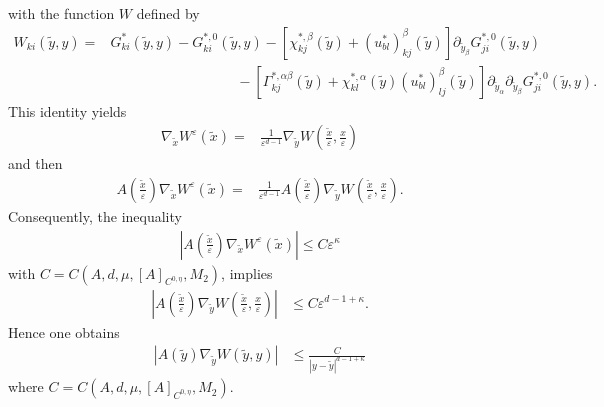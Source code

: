 \documentclass[11pt, reqno]{amsart}
\theoremstyle{definition}
\theoremstyle{remark}
\numberwithin{equation}{section}
\begin{document}
	with the function $W$ defined by
	\begin{align*}
		W_{ki}(\tilde{y},y) =&G_{ki}^* \left(\tilde{y},y\right)-G_{ki}^{*,0}\left(\tilde{y},y\right)- \left[\chi^{*,\beta}_{kj} \left(\tilde{y}\right)+(u^*_{bl})^{\beta}_{kj} \left(\tilde{y}\right)\right]\partial_{\tilde{y}_\beta} G_{ji}^{*,0}\left(\tilde{y},y\right)\\
		&\qquad\qquad\quad \qquad\qquad-\left[\Gamma^{*,\alpha\beta}_{kj}\!\! \left(\tilde{y}\right)+ \chi^{*,\alpha}_{kl}\!\!\left(\tilde{y}\right) (u^*_{bl})^{\beta}_{lj}\!\left( \tilde{y}\right)\right] \partial_{\tilde{y}_\alpha} \partial_{\tilde{y}_\beta}G^{*,0}_{ji}\left(\tilde{y},y\right).
	\end{align*}
	This identity yields 
	\begin{align*}
		\nabla_{\tilde{x}}	W^{\varepsilon} (\tilde{x})
		=&\frac{1}{\varepsilon^{d-1}}  \nabla_{\tilde{y}}W \left(\frac{\tilde{x}}{\varepsilon},\frac{x}{\varepsilon} \right)
	\end{align*}
	and then 
	\begin{align*}
		A\left(\frac{\tilde{x}}{\varepsilon}\right)	\nabla_{\tilde{x}}	W^{\varepsilon} (\tilde{x})
		=&\frac{1}{\varepsilon^{d-1}} A\left(\frac{\tilde{x}}{\varepsilon}\right) \nabla_{\tilde{y}}W \left(\frac{\tilde{x}}{\varepsilon},\frac{x}{\varepsilon} \right).
	\end{align*}
	Consequently, the inequality
	\begin{align*}
		\left|A\left(\frac{\tilde{x}}{\varepsilon}\right)	\nabla_{\tilde{x}}	W^{\varepsilon} (\tilde{x})\right|\leq C \varepsilon^\kappa 
	\end{align*}with $ C=C(A, d, \mu, [A]_{C^{0,\eta}},M_2)$,
	implies
	\begin{align}
		\left |  A\left(\frac{\tilde{x}}{\varepsilon}\right) \nabla_{\tilde{y}}W \left(\frac{\tilde{x}}{\varepsilon},\frac{x}{\varepsilon} \right)\right|   &\leq C \varepsilon^{d-1+\kappa} . \nonumber
	\end{align}
	Hence one obtains
	\begin{align}
		\left |  A\left(\tilde{y}\right) \nabla_{\tilde{y}}W \left(\tilde{y},y\right) \right|  &\leq \frac{C}{|y-\tilde{y}|^{d-1+\kappa}}\label{ineq_AnabW} 
	\end{align}
	where  $C=C(A, d, \mu, [A]_{C^{0,\eta}},M_2)$.\\
	
\end{document}
